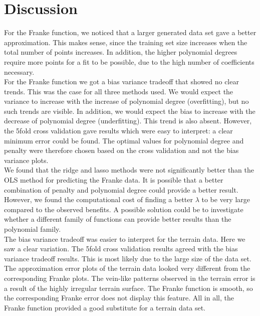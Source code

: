 \documentclass[notitlepage, reprint, nofootinbib]{revtex4-1}
\begin{document}
\clearpage
\section{Discussion}
For the Franke function, we noticed that a larger generated data set gave a better approximation. This makes sense, since the training set size increases when the total number of points increases. In addition, the higher polynomial degrees require more points for a fit to be possible, due to the high number of coefficients necessary. \\[2mm]
For the Franke function we got a bias variance tradeoff that showed no clear trends. This was the case for all three methods used. We would expect the variance to increase with the increase of polynomial degree (overfitting), but no such trends are visible. In addition, we would expect the bias to increase with the decrease of polynomial degree (underfitting). This trend is also absent. However, the 5fold cross validation gave results which were easy to interpret: a clear minimum error could be found. The optimal values for polynomial degree and penalty were therefore chosen based on the cross validation and not the bias variance plots. \\[2mm]
We found that the ridge and lasso methods were not significantly better than the OLS method for predicting the Franke data. It is possible that a better combination of penalty and polynomial degree could provide a better result. However, we found the computational cost of finding a better $\lambda$ to be very large compared to the observed benefits. A possible solution could be to investigate whether a different family of functions can provide better results than the polynomial family. \\[2mm]
The bias variance tradeoff was easier to interpret for the terrain data. Here we saw a clear variation. The 5fold cross validation results agreed with the bias variance tradeoff results. This is most likely due to the large size of the data set. \\[2mm]
The approximation error plots of the terrain data looked very different from the corresponding Franke plots. The vein-like patterns observed in the terrain error is a result of the highly irregular terrain surface. The Franke function is smooth, so the corresponding Franke error does not display this feature. All in all, the Franke function provided a good substitute for a terrain data set.
\end{document}
